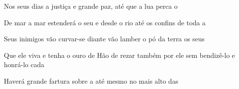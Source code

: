 \begin{greenumerate}
  \item {}Nos seus dias a justiça  e grande paz, até que a lua perca o 

  \item {}De mar a mar estenderá o seu  e desde o rio até os confins de toda a 

  \item {}Seus inimigos vão curvar-se diante  vão lamber o pó da terra os seus 

  \item {}Que ele viva e tenha o ouro de  Hão de rezar também por ele sem  bendizê-lo e honrá-lo cada 

  \item {}Haverá grande fartura sobre a  até mesmo no mais alto das 
\end{greenumerate}










